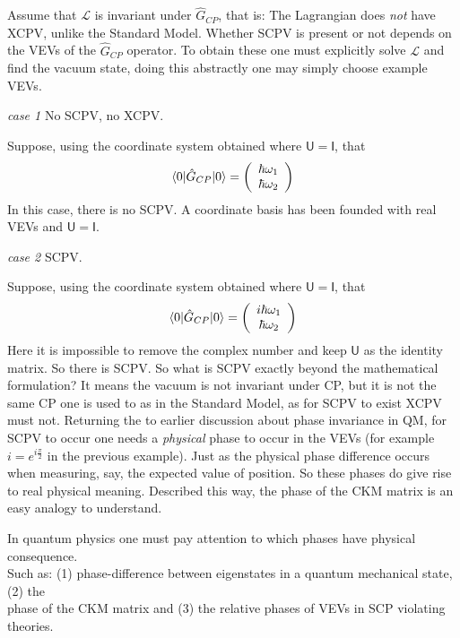 Assume that $\mathcal{L}$ is invariant under $\hat{G}_{CP}$, that is: The Lagrangian does \textit{not} have XCPV, unlike the Standard Model. Whether SCPV is present or not depends on the VEVs of the $\hat{G}_{CP}$ operator. To obtain these one must explicitly solve $\mathcal{L}$ and find the vacuum state, doing this abstractly one may simply choose example VEVs.\\

\begin{flushleft}\textit{case 1} No SCPV, no XCPV. \end{flushleft} 
Suppose, using the coordinate system obtained where $\mathsf{U}=\mathsf{I}$, that
\begin{align*}
\braket{0|\hat{G}_{CP}|0} = \left( \begin{array}{c} \hbar \omega_1 \\ \hbar \omega_2 \end{array}\right)
\end{align*}
In this case, there is no SCPV. A coordinate basis has been founded with real VEVs and $\mathsf{U} = \mathsf{I}$.

\begin{flushleft}\textit{case 2} SCPV. \end{flushleft} 
Suppose, using the coordinate system obtained where $\mathsf{U}=\mathsf{I}$, that
\begin{align*}
\braket{0|\hat{G}_{CP}|0} = \left( \begin{array}{c} i\hbar \omega_1 \\ \hbar \omega_2 \end{array}\right)
\end{align*}
Here it is impossible to remove the complex number and keep $\mathsf{U}$ as the identity matrix. So there is SCPV. So what is SCPV exactly beyond the mathematical formulation? It means the vacuum is not invariant under CP, but it is not the same CP one is used to as in the Standard Model, as for SCPV to exist XCPV must not. Returning the to earlier discussion about phase invariance in QM, for SCPV to occur one  needs a \textit{physical} phase to occur in the VEVs (for example $i=e^{i\frac{\pi}{2}}$ in the previous example). Just as the physical phase difference occurs when measuring, say, the expected value of position. So these phases do give rise to real physical meaning. Described this way, the phase of the CKM matrix is an easy analogy to understand.

\begin{center}
In quantum physics one must pay attention to which phases have physical consequence. \\Such as: (1) phase-difference between eigenstates in a quantum mechanical state, (2) the\\ phase of the CKM matrix and (3) the relative phases of VEVs in SCP violating theories.
\end{center}


